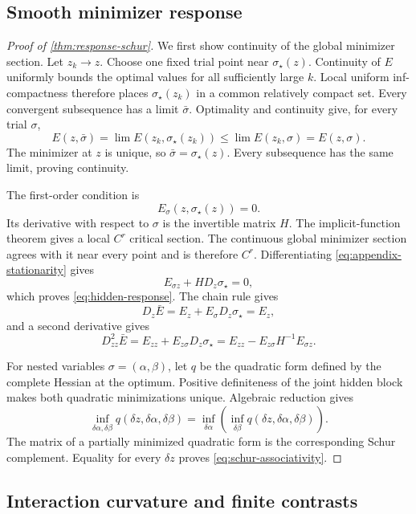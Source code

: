 \subsection{Smooth minimizer response}

\begin{proof}[Proof of \cref{thm:response-schur}]
We first show continuity of the global minimizer section.  Let \(z_k\to z\).
Choose one fixed trial point near \(\sigma_\star(z)\).  Continuity of \(E\)
uniformly bounds the optimal values for all sufficiently large \(k\).  Local
uniform inf-compactness therefore places \(\sigma_\star(z_k)\) in a common
relatively compact set.  Every convergent subsequence has a limit
\(\bar\sigma\).  Optimality and continuity give, for every trial \(\sigma\),
\[
  E(z,\bar\sigma)
  =\lim E(z_k,\sigma_\star(z_k))
  \le\lim E(z_k,\sigma)=E(z,\sigma).
\]
The minimizer at \(z\) is unique, so \(\bar\sigma=\sigma_\star(z)\).  Every
subsequence has the same limit, proving continuity.

The first-order condition is
\begin{equation}
  E_\sigma(z,\sigma_\star(z))=0.
  \label{eq:appendix-stationarity}
\end{equation}
Its derivative with respect to \(\sigma\) is the invertible matrix \(H\).
The implicit-function theorem gives a local \(C^r\) critical section.  The
continuous global minimizer section agrees with it near every point and is
therefore \(C^r\).  Differentiating
\cref{eq:appendix-stationarity} gives
\[
  E_{\sigma z}+H D_z\sigma_\star=0,
\]
which proves \cref{eq:hidden-response}.  The chain rule gives
\[
  D_z\bar E
  =E_z+E_\sigma D_z\sigma_\star=E_z,
\]
and a second derivative gives
\[
  D^2_{zz}\bar E
  =E_{zz}+E_{z\sigma}D_z\sigma_\star
  =E_{zz}-E_{z\sigma}H^{-1}E_{\sigma z}.
\]

For nested variables \(\sigma=(\alpha,\beta)\), let \(q\) be the quadratic
form defined by the complete Hessian at the optimum.  Positive definiteness of
the joint hidden block makes both quadratic minimizations unique.  Algebraic
reduction gives
\[
  \inf_{\delta\alpha,\delta\beta}
  q(\delta z,\delta\alpha,\delta\beta)
  =\inf_{\delta\alpha}
  \left(\inf_{\delta\beta}
  q(\delta z,\delta\alpha,\delta\beta)\right).
\]
The matrix of a partially minimized quadratic form is the corresponding Schur
complement.  Equality for every \(\delta z\) proves
\cref{eq:schur-associativity}.
\end{proof}

\subsection{Interaction curvature and finite contrasts}

